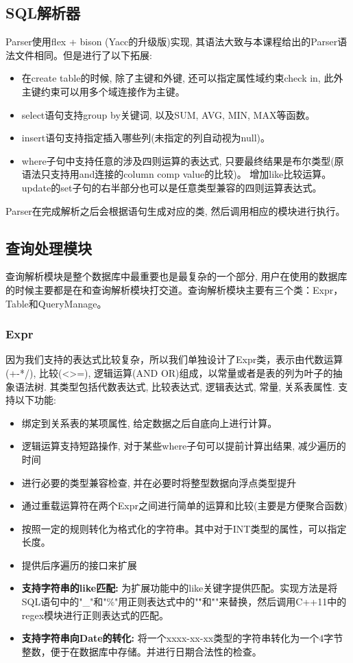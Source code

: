 \documentclass[11pt,UTF8]{report}
\begin{document}
\subsection{SQL解析器}
Parser使用flex + bison (Yacc的升级版)实现, 其语法大致与本课程给出的Parser语法文件相同。但是进行了以下拓展:
\begin{itemize}
	\item 在create table的时候, 除了主键和外键, 还可以指定属性域约束check in, 此外主键约束可以用多个域连接作为主键。
	\item select语句支持group by关键词, 以及SUM, AVG, MIN, MAX等函数。
	\item insert语句支持指定插入哪些列(未指定的列自动视为null)。
	\item where子句中支持任意的涉及四则运算的表达式, 只要最终结果是布尔类型(原语法只支持用and连接的column comp value的比较)。 增加like比较运算。 update的set子句的右半部分也可以是任意类型兼容的四则运算表达式。
\end{itemize}

Parser在完成解析之后会根据语句生成对应的类, 然后调用相应的模块进行执行。

\subsection{查询处理模块}
查询解析模块是整个数据库中最重要也是最复杂的一个部分, 用户在使用的数据库的时候主要都是在和查询解析模块打交道。查询解析模块主要有三个类：Expr，Table和QueryManage。

\subsubsection{Expr}
因为我们支持的表达式比较复杂，所以我们单独设计了Expr类，表示由代数运算(+-*/), 比较(<>=), 逻辑运算(AND OR)组成，以常量或者是表的列为叶子的抽象语法树. 其类型包括代数表达式, 比较表达式, 逻辑表达式, 常量, 关系表属性. 支持以下功能:
\begin{itemize}
	\item 绑定到关系表的某项属性, 给定数据之后自底向上进行计算。
	\item 逻辑运算支持短路操作, 对于某些where子句可以提前计算出结果, 减少遍历的时间
	\item 进行必要的类型兼容检查, 并在必要时将整型数据向浮点类型提升
	\item 通过重载运算符在两个Expr之间进行简单的运算和比较(主要是方便聚合函数)
	\item 按照一定的规则转化为格式化的字符串。其中对于INT类型的属性，可以指定长度。
	\item 提供后序遍历的接口来扩展
	\item \textbf{支持字符串的like匹配:} 为扩展功能中的like关键字提供匹配。实现方法是将SQL语句中的"\_"和"\%"用正则表达式中的"\."和"\.\*"来替换，然后调用C++11中的regex模块进行正则表达式的匹配。
	\item \textbf{支持字符串向Date的转化:} 将一个xxxx-xx-xx类型的字符串转化为一个4字节整数，便于在数据库中存储。并进行日期合法性的检查。
\end{itemize}
\end{document}
